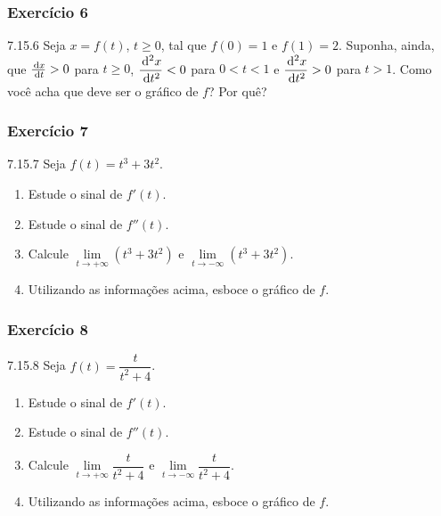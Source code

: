 \subsubsection*{Exercício 6}
\begin{exercicio}[6]{7.15.6}
Seja $x = f(t)$, $t \ge 0$, tal que $f(0) = 1$ e $f(1) = 2$. Suponha, ainda, que $\frac{\,\mathrm{d} x}{\,\mathrm{d} t} > 0$ para $t \ge 0$, $\dfrac{\,\mathrm{d}^2x}{\,\mathrm{d} t^2} < 0$ para $0 < t < 1$ e $\dfrac{\,\mathrm{d}^2x}{\,\mathrm{d} t^2} > 0$ para $t > 1$. Como você acha que deve ser o gráfico de $f$? Por quê?
\end{exercicio}

\subsubsection*{Exercício 7}
\begin{exercicio}[7]{7.15.7}
Seja $f(t) = t^3 + 3t^2$.
\begin{enumerate}[label=\alph*)]
    \item Estude o sinal de $f'(t)$.
    \item Estude o sinal de $f''(t)$.
    \item Calcule $\lim\limits_{t \to +\infty} (t^3 + 3t^2)$ e $\lim\limits_{t \to -\infty} (t^3 + 3t^2)$.
    \item Utilizando as informações acima, esboce o gráfico de $f$.
\end{enumerate}
\end{exercicio}

\subsubsection*{Exercício 8}
\begin{exercicio}[8]{7.15.8}
Seja $f(t) = \dfrac{t}{t^2 + 4}$.
\begin{enumerate}[label=\alph*)]
    \item Estude o sinal de $f'(t)$.
    \item Estude o sinal de $f''(t)$.
    \item Calcule $\lim\limits_{t \to +\infty} \dfrac{t}{t^2 + 4}$ e $\lim\limits_{t \to -\infty} \dfrac{t}{t^2 + 4}$.
    \item Utilizando as informações acima, esboce o gráfico de $f$.
\end{enumerate}
\end{exercicio}

